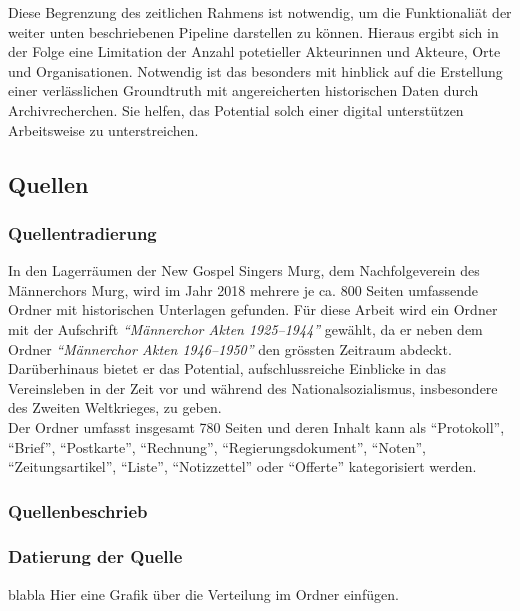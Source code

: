 \documentclass[12pt, a4paper, ngerman, bidi=default]{article}
\begin{document}
Diese Begrenzung des zeitlichen Rahmens ist notwendig, um die Funktionaliät der weiter unten beschriebenen Pipeline darstellen zu können. 
Hieraus ergibt sich in der Folge eine Limitation der Anzahl potetieller Akteurinnen und Akteure, Orte und Organisationen. Notwendig ist das 
besonders mit hinblick auf die Erstellung einer verlässlichen Groundtruth mit angereicherten
historischen Daten durch Archivrecherchen. Sie helfen, das Potential solch einer digital unterstützen Arbeitsweise zu unterstreichen. 


\subsection{Quellen}
\subsubsection{Quellentradierung}
In den Lagerräumen der New Gospel Singers Murg, dem Nachfolgeverein des Männerchors Murg, 
wird im Jahr 2018 mehrere je ca. 800 Seiten umfassende Ordner mit historischen Unterlagen gefunden. 
Für diese Arbeit wird ein Ordner mit der Aufschrift \textit{\enquote{Männerchor Akten 1925--1944}} gewählt, da er neben dem Ordner 
\textit{\enquote{Männerchor Akten 1946--1950}} den grössten Zeitraum abdeckt. Darüberhinaus bietet er das Potential, aufschlussreiche Einblicke in das Vereinsleben
in der Zeit vor und während des Nationalsozialismus, insbesondere des Zweiten Weltkrieges, zu geben.\\ 
Der Ordner umfasst insgesamt 780 Seiten und deren Inhalt kann als \enquote{Protokoll}, \enquote{Brief}, \enquote{Postkarte}, \enquote{Rechnung}, 
\enquote{Regierungsdokument}, \enquote{Noten}, \enquote{Zeitungsartikel}, \enquote{Liste}, \enquote{Notizzettel} oder \enquote{Offerte} kategorisiert werden.


\subsubsection{Quellenbeschrieb}


\subsubsection{Datierung der Quelle}
blabla
Hier eine Grafik über die Verteilung im Ordner einfügen. 
\end{document}
